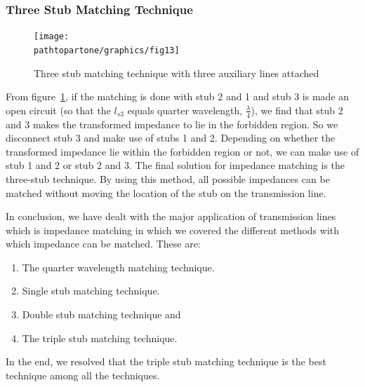 \subsubsection{Three Stub Matching Technique}
\begin{figure}[h]
\centering
\texttt{[image: \\pathtopartone/graphics/fig13]}
\caption{Three stub matching technique with three auxiliary lines attached}
\label{fig:fig13}
\end{figure}

From figure~\ref{fig:fig13}, if the matching is done with stub 2 and 1 and stub 3 is made an open circuit (so that the $ l_{s3}$ equals quarter wavelength, $\frac{\lambda}{4}$), we find that stub 2 and 3 makes the transformed impedance to lie in the forbidden region. So we disconnect stub 3 and make use of stubs 1 and 2. Depending on whether the transformed impedance lie within the forbidden region or not, we can make use of stub 1 and 2 or stub 2 and 3. The final solution for impedance matching is the three-stub technique. By using this method, all possible impedances can be matched without moving the location of the stub on the transmission line.

In conclusion, we have dealt with the major application of transmission lines which is impedance matching in which we covered the different methods with which impedance can be matched. These are:
\begin{enumerate}
\item The quarter wavelength matching technique.
\item Single stub matching technique.
\item Double stub matching technique and
\item The triple stub matching technique.
\end{enumerate}

In the end, we resolved that the triple stub matching technique is the best technique among all the techniques.



